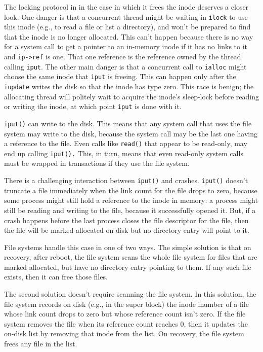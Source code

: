 The locking protocol in 
in the case in which it frees the inode deserves a closer look.
One danger is that a concurrent thread might be waiting in
\lstinline{ilock}
to use this inode (e.g., to read a file or list a directory),
and won't be prepared to find that the inode is no longer
allocated. This can't happen because there is no way for
a system call to get a pointer to an in-memory inode if it has
no links to it and 
\lstinline{ip->ref}
is one. That one reference is the reference owned by the
thread calling
\lstinline{iput}.
The other main danger is that a concurrent call to
\lstinline{ialloc}
might choose the same inode that
\lstinline{iput}
is freeing.
This can happen only after the
\lstinline{iupdate}
writes the disk so that the inode has type zero.
This race is benign; the allocating thread will politely wait
to acquire the inode's sleep-lock before reading or writing
the inode, at which point
\lstinline{iput}
is done with it.

\lstinline{iput()}
can write to the disk.  This means that any system call that uses the file
system may write to the disk, because the system call may be the last one having
a reference to the file. Even calls like
\lstinline{read()}
that appear to be read-only, may end up calling
\lstinline{iput().}
This, in turn, means that even read-only system calls
must be wrapped in transactions if they use the file system.

There is a challenging interaction between
\lstinline{iput()}
and crashes.
\lstinline{iput()}
doesn't truncate a file immediately when the link count for the file
drops to zero, because some process might still hold a reference to the inode in
memory: a process might still be reading and writing to the file, because it
successfully opened it. But, if a crash happens before the last process closes
the file descriptor for the file, then the file will be marked allocated on disk
but no directory entry will point to it.

File systems handle this case in one of two ways. The simple solution is that on
recovery, after reboot, the file system scans the whole file system for files
that are marked allocated, but have no directory entry pointing to them.  If any
such file exists, then it can free those files.

The second solution doesn't require scanning the file system.  In this solution,
the file system records on disk (e.g., in the super block) the inode inumber of
a file whose link count drops to zero but whose reference count isn't zero.  If
the file system removes the file when its reference count reaches 0, then it
updates the on-disk list by removing that inode from the list. On recovery, the
file system frees any file in the list.


